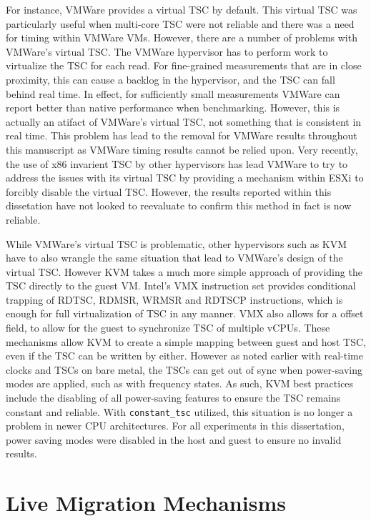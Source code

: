 For instance, VMWare provides a virtual TSC by default. This virtual TSC was particularly useful when multi-core TSC were not reliable and there was a need for timing within VMWare VMs. However, there are a number of problems with VMWare's virtual TSC. The VMWare hypervisor has to perform work to virtualize the TSC for each read.  For fine-grained measurements that are in close proximity, this can cause a backlog in the hypervisor, and the TSC can fall behind real time. In effect, for sufficiently small measurements VMWare can report better than native performance when benchmarking.  However, this is actually an atifact of VMWare's virtual TSC, not something that is consistent in real time. This problem has lead to the removal for VMWare results throughout this manuscript as VMWare timing results cannot be relied upon. Very recently, the use of x86 invarient TSC by other hypervisors has lead VMWare to try to address the issues with its virtual TSC by providing a mechanism within ESXi to forcibly disable the virtual TSC.  However, the results reported within this dissetation have not looked to reevaluate to confirm this method in fact is now reliable. 

While VMWare's virtual TSC is problematic, other hypervisors such as KVM have to also wrangle the same situation that lead to VMWare's design of the virtual TSC. However KVM takes a much more simple approach of providing the TSC directly to the guest VM. Intel's VMX instruction set provides conditional trapping of RDTSC, RDMSR, WRMSR and RDTSCP instructions, which is enough for full virtualization of TSC in any manner. VMX also allows for a offset field, to allow for the guest to synchronize TSC of multiple vCPUs. These mechanisms allow KVM to create a simple mapping between guest and host TSC, even if the TSC can be written by either.  However as noted earlier with real-time clocks and TSCs on bare metal, the TSCs can get out of sync when power-saving modes are applied, such as with frequency states. As such, KVM best practices include the disabling of all power-saving features to ensure the TSC remains constant and reliable.  With \verb|constant_tsc| utilized, this situation is no longer a problem in newer CPU architectures. For all experiments in this dissertation, power saving modes were disabled in the host and guest to ensure no invalid results.  



\section{Live Migration Mechanisms}


